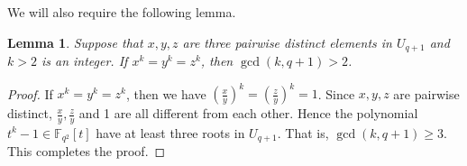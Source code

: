 \documentclass[10pt]{article}%
\newtheorem{lemma}{Lemma}
\begin{document}
	We will also require the following lemma.
	\begin{lemma}
		\label{sec3 lem4}
		Suppose that $x,y,z$ are three pairwise distinct elements in $U_{q+1}$ and $k>2$ is an integer. If $x^{k}=y^{k}=z^{k}$, then $\gcd(k,q+1)>2$.
	\end{lemma}
	\begin{proof}
		If $x^{k}=y^{k}=z^{k}$, then we have $\left(\frac{x}{y}\right)^k=\left(\frac{z}{y}\right)^k=1$. Since $x,y,z$ are pairwise distinct, $\frac{x}{y},\frac{z}{y}$ and 1 are all different from each other. Hence the polynomial $t^k-1\in\mathbb{F}_{q^2}[t]$ have at least three roots in $U_{q+1}$. That is, $\gcd(k,q+1)\ge3$.
		This completes the proof.
	\end{proof}
	
\end{document}
